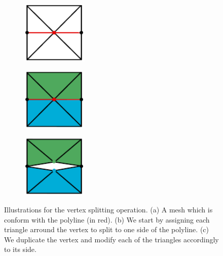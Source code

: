 \begin{figure}[p]
\centering
\begin{subfigure}[c]{0.3\linewidth}
\centering
\includegraphics[height=3cm]{images/cutting-mig2015/vertex_splitting_1.pdf}
\caption{\label{fig:vertexSplitting1}}
\end{subfigure}
\begin{subfigure}[c]{0.3\linewidth}
\centering
\includegraphics[height=3cm]{images/cutting-mig2015/vertex_splitting_2.pdf}
\caption{\label{fig:vertexSplitting2}}
\end{subfigure}
\begin{subfigure}[c]{0.3\linewidth}
\centering
\includegraphics[height=3cm]{images/cutting-mig2015/vertex_splitting_3.pdf}
\caption{\label{fig:vertexSplitting3}}
\end{subfigure}
\caption[Frame-based cutting: Vertex splitting]{\label{fig:vertexSplitting} Illustrations for the vertex splitting operation. (a) A mesh which is conform with the polyline (in red). (b) We start by assigning each triangle arround the vertex to split to one side of the polyline. (c) We duplicate the vertex and modify each of the triangles accordingly to its side.}
\end{figure}
